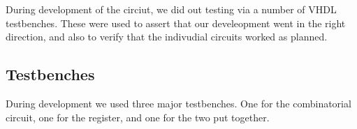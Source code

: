 During development of the circiut, we did out testing via a number of VHDL testbenches. These were used to assert that our 
develeopment went in the right direction, and also to verify that the indivudial circuits worked as planned.
\subsection{Testbenches}
During development we used three major testbenches. One for the combinatorial circuit, one for the register, and one for the 
two put together.

